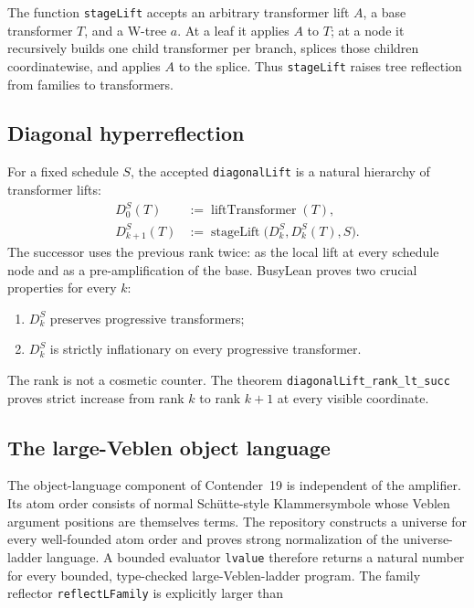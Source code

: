 \documentclass[11pt]{article}
\theoremstyle{definition}
\theoremstyle{remark}
\newcommand{\leanname}[1]{\nolinkurl{#1}}
\begin{document}
The function \leanname{stageLift} accepts an arbitrary transformer lift $A$, a
base transformer $T$, and a W-tree $a$.  At a leaf it applies $A$ to $T$; at a
node it recursively builds one child transformer per branch, splices those
children coordinatewise, and applies $A$ to the splice.  Thus
\leanname{stageLift} raises tree reflection from families to transformers.

\subsection{Diagonal hyperreflection}

For a fixed schedule $S$, the accepted \leanname{diagonalLift} is a natural
hierarchy of transformer lifts:
\begin{align*}
  D^S_0(T) &:= \operatorname{liftTransformer}(T),\\
  D^S_{k+1}(T) &:=
    \operatorname{stageLift}\bigl(D^S_k,D^S_k(T),S\bigr).
\end{align*}
The successor uses the previous rank twice: as the local lift at every schedule
node and as a pre-amplification of the base.  BusyLean proves two crucial
properties for every $k$:

\begin{enumerate}[leftmargin=*]
\item $D^S_k$ preserves progressive transformers;
\item $D^S_k$ is strictly inflationary on every progressive transformer.
\end{enumerate}

The rank is not a cosmetic counter.  The theorem
\leanname{diagonalLift_rank_lt_succ} proves strict increase from rank $k$ to
rank $k+1$ at every visible coordinate.

\subsection{The large-Veblen object language}

The object-language component of Contender~19 is independent of the amplifier.
Its atom order consists of normal Sch\"utte-style Klammersymbole whose Veblen
argument positions are themselves terms.  The repository constructs a universe
for every well-founded atom order and proves strong normalization of the
universe-ladder language.  A bounded evaluator \leanname{lvalue} therefore
returns a natural number for every bounded, type-checked large-Veblen-ladder
program.  The family reflector
\leanname{reflectLFamily} is explicitly larger than
\end{document}
